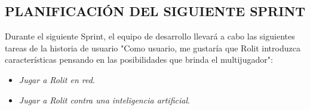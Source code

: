 \documentclass[../../SCRUM.tex]{subfiles}
\begin{document}
\subsection{PLANIFICACIÓN DEL SIGUIENTE SPRINT}
Durante el siguiente Sprint, el equipo de desarrollo llevará a cabo las siguientes tareas de la historia de usuario "Como usuario, me gustaría que Rolit introduzca características pensando en las posibilidades que brinda el multijugador":
\begin{itemize}
\item \textit{Jugar a Rolit en red}.
\item \textit{Jugar a Rolit contra una inteligencia artificial}.
\end{itemize}
\end{document}
